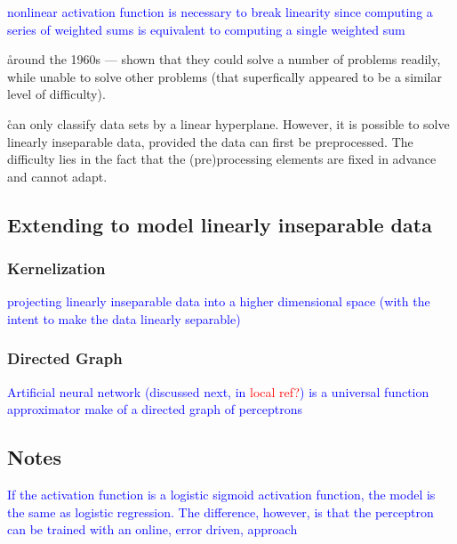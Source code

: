 \textcolor{blue}{}

\textcolor{blue}{nonlinear activation function is necessary to break linearity since computing a series of weighted sums is equivalent to computing a single weighted sum}

\r{around the 1960s --- shown that they could solve a number of problems readily, while unable to solve other problems (that superfically appeared to be a similar level of difficulty). }

\r{can only classify data sets by a linear hyperplane. However, it is possible to solve linearly inseparable data, provided the data can first be preprocessed. The difficulty lies in the fact that the (pre)processing elements are fixed in advance and cannot adapt.}


\subsection{Extending to model linearly inseparable data}

\subsubsection{Kernelization}

\textcolor{blue}{projecting linearly inseparable data into a higher dimensional space (with the intent to make the data linearly separable)}

\subsubsection{Directed Graph}

\textcolor{blue}{Artificial neural network (discussed next, in \textcolor{red}{local ref?}) is a universal function approximator make of a directed graph of perceptrons}

\subsection{Notes}

\textcolor{blue}{If the activation function is a logistic sigmoid activation function, the model is the same as logistic regression.  The difference, however, is that the perceptron can be trained with an online, error driven, approach}